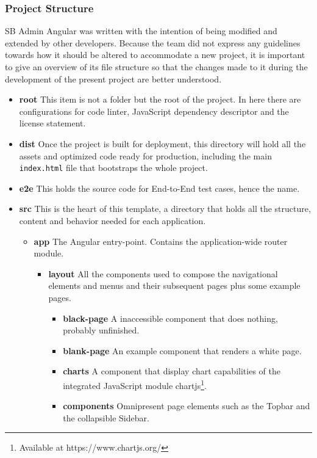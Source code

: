 \subsubsection{Project Structure}
SB Admin Angular was written with the intention of being modified and extended by other developers. Because the team did not express any guidelines towards how it should be altered to accommodate a new project, it is important to give an overview of its file structure so that the changes made to it during the development of the present project are better understood.

\begin{itemize}
\item \textbf{root} This item is not a folder but the root of the project. In here there are configurations for code linter, JavaScript dependency descriptor and the license statement.
\item \textbf{dist} Once the project is built for deployment, this directory will hold all the assets and optimized code ready for production, including the main \texttt{index.html} file that bootstraps the whole project.
\item \textbf{e2e} This holds the source code for End-to-End test cases, hence the name.
\item \textbf{src} This is the heart of this template, a directory that holds all the structure, content and behavior needed for each application. \leavevmode
  \begin{itemize}
  \item \textbf{app} The Angular entry-point. Contains the application-wide router module.
    \begin{itemize}
    \item \textbf{layout} All the components used to compose the navigational elements and menus and their subsequent pages plus some example pages. \leavevmode
      \begin{itemize}
      \item \textbf{black-page} A inaccessible component that does nothing, probably unfinished.
      \item \textbf{blank-page} An example component that renders a white page.
      \item \textbf{charts} A component that display chart capabilities of the integrated JavaScript module chartjs\footnote{Available at https://www.chartjs.org/}.
          \item \textbf{components} Omnipresent page elements such as the Topbar and the collapsible Sidebar.

\end{itemize}
\end{itemize}
\end{itemize}
\end{itemize}
